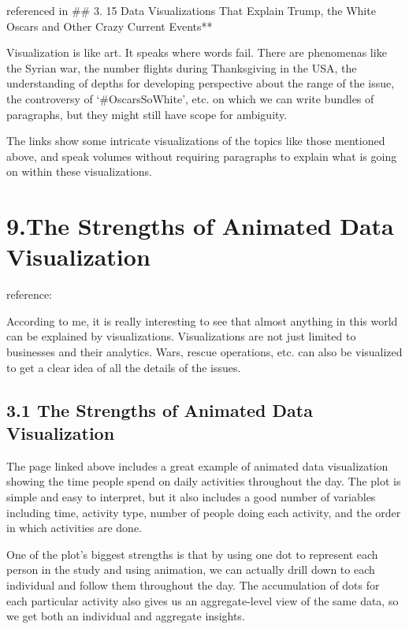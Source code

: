 \documentclass[]{book}
\theoremstyle{definition}
\theoremstyle{definition}
\theoremstyle{definition}
\theoremstyle{remark}
\begin{document}
\citep{American_life} referenced in \citep{int_viz_2} \#\# 3. 15 Data
Visualizations That Explain Trump, the White Oscars and Other Crazy
Current Events** \citep{int_viz_2}

Visualization is like art. It speaks where words fail. There are
phenomenas like the Syrian war, the number flights during Thanksgiving
in the USA, the understanding of depths for developing perspective about
the range of the issue, the controversy of `\#OscarsSoWhite', etc. on
which we can write bundles of paragraphs, but they might still have
scope for ambiguity.

The links show some intricate visualizations of the topics like those
mentioned above, and speak volumes without requiring paragraphs to
explain what is going on within these visualizations.

\section{9.The Strengths of Animated Data
Visualization}\label{the-strengths-of-animated-data-visualization-1}

reference:\citep{American_life}

According to me, it is really interesting to see that almost anything in
this world can be explained by visualizations. Visualizations are not
just limited to businesses and their analytics. Wars, rescue operations,
etc. can also be visualized to get a clear idea of all the details of
the issues.

\subsection{3.1 The Strengths of Animated Data
Visualization}\label{the-strengths-of-animated-data-visualization-2}

The page linked above includes a great example of animated data
visualization showing the time people spend on daily activities
throughout the day. The plot is simple and easy to interpret, but it
also includes a good number of variables including time, activity type,
number of people doing each activity, and the order in which activities
are done.

One of the plot's biggest strengths is that by using one dot to
represent each person in the study and using animation, we can actually
drill down to each individual and follow them throughout the day. The
accumulation of dots for each particular activity also gives us an
aggregate-level view of the same data, so we get both an individual and
aggregate insights.
\end{document}
